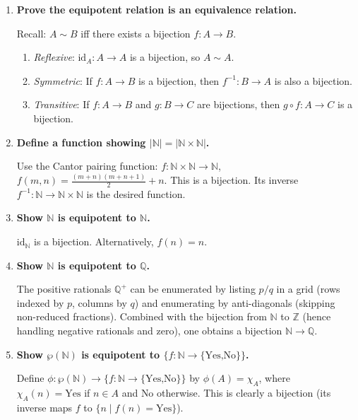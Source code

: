 \documentclass[11pt]{book}
\def\NN{\mathbb{N}}
\def\ZN{\mathbb{Z}}
\def\QN{\mathbb{Q}}
\begin{document}
\begin{enumerate}[{0.}1. ]
\item \textbf{Prove the equipotent relation is an equivalence relation.}

Recall: $A \sim B$ iff there exists a bijection $f: A\to B$.

\begin{enumerate}
\item \textit{Reflexive}: $\mathrm{id}_A: A\to A$ is a bijection, so $A\sim A$.
\item \textit{Symmetric}: If $f: A\to B$ is a bijection, then $f^{-1}: B\to A$ is also a bijection.
\item \textit{Transitive}: If $f: A\to B$ and $g: B\to C$ are bijections, then $g\circ f: A\to C$ is a bijection.
\end{enumerate}

\item \textbf{Define a function showing $|\NN|=|\NN\times\NN|$.}

Use the Cantor pairing function: $f: \NN\times\NN\to\NN$, $f(m,n)=\frac{(m+n)(m+n+1)}{2}+n$. This is a bijection. Its inverse $f^{-1}: \NN\to\NN\times\NN$ is the desired function.

\item \textbf{Show $\NN$ is equipotent to $\NN$.}

$\mathrm{id}_\NN$ is a bijection. Alternatively, $f(n)=n$.

\item \textbf{Show $\NN$ is equipotent to $\QN$.}

The positive rationals $\QN^+$ can be enumerated by listing $p/q$ in a grid (rows indexed by $p$, columns by $q$) and enumerating by anti-diagonals (skipping non-reduced fractions). Combined with the bijection from $\NN$ to $\ZN$ (hence handling negative rationals and zero), one obtains a bijection $\NN\to\QN$.

\item \textbf{Show $\wp(\NN)$ is equipotent to $\{f:\NN\to\{\text{Yes,No}\}\}$.}

Define $\phi: \wp(\NN)\to\{f:\NN\to\{\text{Yes,No}\}\}$ by $\phi(A) = \chi_A$, where $\chi_A(n)=\text{Yes}$ if $n\in A$ and $\text{No}$ otherwise. This is clearly a bijection (its inverse maps $f$ to $\{n\mid f(n)=\text{Yes}\}$).


\end{enumerate}
\end{document}
